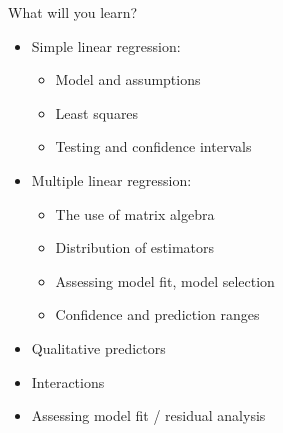 \documentclass[
  10pt,
  ignorenonframetext,
]{beamer}
\providecommand{\tightlist}{%
  \setlength{\itemsep}{0pt}\setlength{\parskip}{0pt}}
\begin{document}
\begin{frame}
\begin{block}{What will you learn?}
\protect\hypertarget{what-will-you-learn}{}
\vspace{2mm}

\begin{itemize}
\tightlist
\item
  Simple linear regression:

  \begin{itemize}
  \tightlist
  \item
    Model and assumptions
  \item
    Least squares
  \item
    Testing and confidence intervals
  \end{itemize}
\end{itemize}

\vspace{2mm}

\begin{itemize}
\tightlist
\item
  Multiple linear regression:

  \begin{itemize}
  \tightlist
  \item
    The use of matrix algebra
  \item
    Distribution of estimators
  \item
    Assessing model fit, model selection
  \item
    Confidence and prediction ranges
  \end{itemize}
\end{itemize}

\vspace{2mm}

\begin{itemize}
\tightlist
\item
  Qualitative predictors
\end{itemize}

\vspace{2mm}

\begin{itemize}
\tightlist
\item
  Interactions
\end{itemize}

\vspace{2mm}

\begin{itemize}
\tightlist
\item
  Assessing model fit / residual analysis
\end{itemize}
\end{block}
\end{frame}
\end{document}
